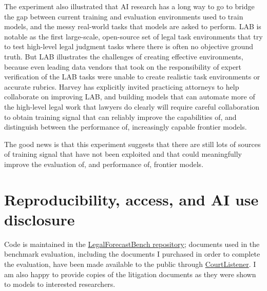 \documentclass[11pt]{article}
\begin{document}
The experiment also illustrated that AI research has a long way to go to bridge the gap between current training and evaluation environments used to train models, and the messy real-world tasks that models are asked to perform. LAB is notable as the first large-scale, open-source set of legal task environments that try to test high-level legal judgment tasks where there is often no objective ground truth. But LAB illustrates the challenges of creating effective environments, because even leading data vendors that took on the responsibility of expert verification of the LAB tasks were unable to create realistic task environments or accurate rubrics. Harvey has explicitly invited practicing attorneys to help collaborate on improving LAB, and building models that can automate more of the high-level legal work that lawyers do clearly will require careful collaboration to obtain training signal that can reliably improve the capabilities of, and distinguish between the performance of, increasingly capable frontier models.

The good news is that this experiment suggests that there are still lots of sources of training signal that have not been exploited and that could meaningfully improve the evaluation of, and performance of, frontier models. 

\section*{Reproducibility, access, and AI use disclosure}
Code is maintained in the \href{https://github.com/johnhughes3/LegalForecastBench}{LegalForecastBench repository}; documents used in the benchmark evaluation, including the documents I purchased in order to complete the evaluation, have been made available to the public through \href{https://www.courtlistener.com/}{CourtListener}. I am also happy to provide copies of the litigation documents as they were shown to models to interested researchers.
\end{document}
